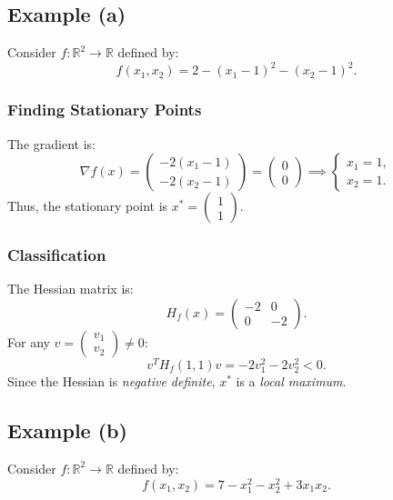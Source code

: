 \documentclass{article}
\begin{document}
\subsection*{Example (a)}
Consider \( f : \mathbb{R}^2 \rightarrow \mathbb{R} \) defined by:
\[
f(x_1, x_2) = 2 - (x_1 - 1)^2 - (x_2 - 1)^2.
\]

\subsubsection*{Finding Stationary Points}
The gradient is:
\[
\nabla f(x) = 
\begin{pmatrix}
-2(x_1 - 1) \\
-2(x_2 - 1)
\end{pmatrix}
=
\begin{pmatrix}
0 \\
0
\end{pmatrix}
\implies
\begin{cases}
x_1 = 1, \\
x_2 = 1.
\end{cases}
\]
Thus, the stationary point is \( x^* = \begin{pmatrix} 1 \\ 1 \end{pmatrix} \).

\subsubsection*{Classification}
The Hessian matrix is:
\[
H_f(x) = 
\begin{pmatrix}
-2 & 0 \\
0 & -2
\end{pmatrix}.
\]
For any \( v = \begin{pmatrix} v_1 \\ v_2 \end{pmatrix} \neq 0 \):
\[
v^T H_f(1,1) v = -2v_1^2 - 2v_2^2 < 0.
\]
Since the Hessian is \textit{negative definite}, \( x^* \) is a \textit{local maximum}.

\subsection*{Example (b)}
Consider \( f : \mathbb{R}^2 \rightarrow \mathbb{R} \) defined by:
\[
f(x_1, x_2) = 7 - x_1^2 - x_2^2 + 3x_1 x_2.
\]
\end{document}
